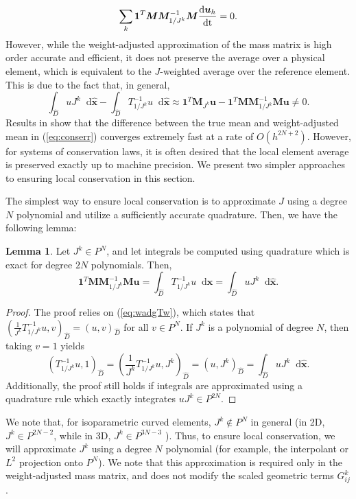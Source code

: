 \documentclass[10pt]{amsart}
\theoremstyle{definition}
\theoremstyle{lemma}
\newtheorem{lemma}{Lemma}
\theoremstyle{theorem}
\theoremstyle{assumption}
\renewcommand{\hat}{\widehat}
\newcommand{\td}[2]{\frac{{\rm d}#1}{{\rm d}{\rm #2}}}
\newcommand{\LRp}[1]{\left( #1 \right)}
\newcommand*\diff[1]{\mathop{}\!{\mathrm{d}#1}} %
\begin{document}
{\[
\sum_k \bm{1}^T\bm{M}\bm{M}_{1/J^k}^{-1}\bm{M}\td{\bm{u}_h}{t} = 0.
\]
However, while the weight-adjusted approximation of the mass matrix is high order accurate and efficient, it does not preserve the average over a physical element, which is equivalent to the $J$-weighted average over the reference element.  This is due to the fact that, in general,
\begin{equation}
\int_{\hat{D}}u J^k \diff{\hat{\bm{x}}} - \int_{\hat{D}} T_{1/J^k}^{-1}u \diff{\hat{\bm{x}}} \approx \bm{1}^T\bm{M}_{J^k}\bm{u} - \bm{1}^T\bm{M}\bm{M}_{1/J^k}^{-1}\bm{M}\bm{u} \neq 0.  
\label{eq:conserr}
\end{equation}
Results in \cite{chan2016weight1} show that the difference between the true mean and weight-adjusted mean in (\ref{eq:conserr}) converges extremely fast at a rate of $O(h^{2N+2})$.  However, for systems of conservation laws, it is often desired that the local element average is preserved exactly up to machine precision.  We present two simpler approaches to ensuring local conservation in this section.  

The simplest way to ensure local conservation is to approximate $J$ using a degree $N$ polynomial and utilize a sufficiently accurate quadrature.  Then, we have the following lemma:
\begin{lemma}
Let $J^k \in P^N$, and let integrals be computed using quadrature which is exact for degree $2N$ polynomials.  Then, 
\[
\bm{1}^T\bm{M}\bm{M}^{-1}_{1/J^k}\bm{M}\bm{u} = \int_{\hat{D}}T^{-1}_{1/J^k} u \diff{\hat{\bm{x}}}=  \int_{\hat{D}} u J^k\diff{\hat{\bm{x}}}.
\]
\label{eq:conscorrect1}
\end{lemma}
\begin{proof}
The proof relies on (\ref{eq:wadgTw}), which states that $\LRp{\frac{1}{J^k} T^{-1}_{1/J^k}u,v}_{\hat{D}} = \LRp{u,v}_{\hat{D}}$ for all $v\in P^N$.  If $J^k$ is a polynomial of degree $N$, then taking $v = 1$ yields
\[
\LRp{T^{-1}_{1/J^k}u,1}_{\hat{D}} = \LRp{\frac{1}{J^k}T^{-1}_{1/J^k}u,{J^k}}_{\hat{D}}= \LRp{u,{J^k}}_{\hat{D}} = \int_{\hat{D}} uJ^k\diff{\hat{\bm{x}}}. 
\]
Additionally, the proof still holds if integrals are approximated using a quadrature rule which exactly integrates $uJ^k \in P^{2N}$.
\end{proof}
We note that, for isoparametric curved elements, $J^k \not\in P^N$ in general (in 2D, $J^k \in P^{2N-2}$, while in 3D, $J^k \in P^{3N-3}$ \cite{johnen2013geometrical}).  Thus, to ensure local conservation, we will approximate $J^k$ using a degree $N$ polynomial (for example, the interpolant or $L^2$ projection onto $P^N$).  We note that this approximation is required only in the weight-adjusted mass matrix, and does not modify the scaled geometric terms $G^k_{ij}$.  

}
\end{document}
